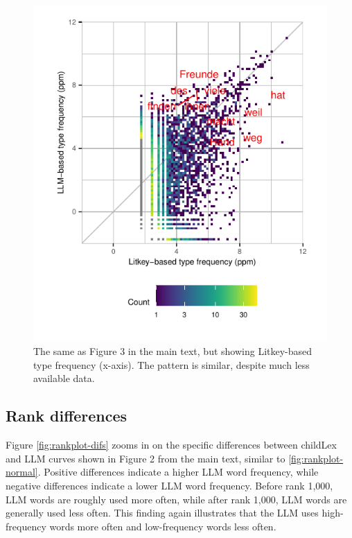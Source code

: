 \documentclass[doc, a4paper, anonymous]{apa7}
\begin{document}
\begin{figure}[!htbp]
    \includegraphics[width = 0.8\paperwidth]{figures/litkey.pdf}
    \caption{The same as Figure 3 in the main text, but showing Litkey-based type frequency (x-axis). The pattern is similar, despite much less available data. }
    \label{fig:corlitkey}
\end{figure}

\clearpage


\subsection{Rank differences}

Figure \ref{fig:rankplot-difs} zooms in on the specific differences between childLex and LLM curves shown in Figure 2 from the main text, similar to \ref{fig:rankplot-normal}. Positive differences indicate a higher LLM word frequency, while negative differences indicate a lower LLM word frequency. Before rank 1,000, LLM words are roughly used more often, while after rank 1,000, LLM words are generally used less often. This finding again illustrates that the LLM uses high-frequency words more often and low-frequency words less often.  
\end{document}
